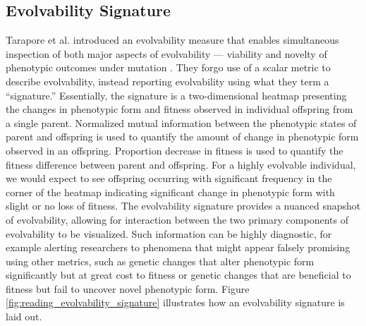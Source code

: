 \subsection{Evolvability Signature}
Tarapore et al. introduced an evolvability measure that enables simultaneous inspection of both major aspects of evolvability --- viability and novelty of phenotypic outcomes under mutation \cite{tarapore2015evolvability}.
They forgo use of a scalar metric to describe evolvability, instead reporting evolvability using what they term a ``signature.''
Essentially, the signature is a two-dimensional heatmap presenting the changes in phenotypic form and fitness observed in individual offspring from a single parent.
Normalized mutual information between the phenotypic states of parent and offspring is used to quantify the amount of change in phenotypic form observed in an offspring.
Proportion decrease in fitness is used to quantify the fitness difference between parent and offspring.
For a highly evolvable individual, we would expect to see offspring occurring with significant frequency in the corner of the heatmap indicating significant change in phenotypic form with slight or no loss of fitness.
The evolvability signature provides a nuanced snapshot of evolvability, allowing for interaction between the two primary components of evolvability to be visualized.
Such information can be highly diagnostic, for example alerting researchers to phenomena that might appear falsely promising using other metrics, such as genetic changes that alter phenotypic form significantly but at great cost to fitness or genetic changes that are beneficial to fitness but fail to uncover novel phenotypic form.
Figure \ref{fig:reading_evolvability_signature} illustrates how an evolvability signature is laid out.


